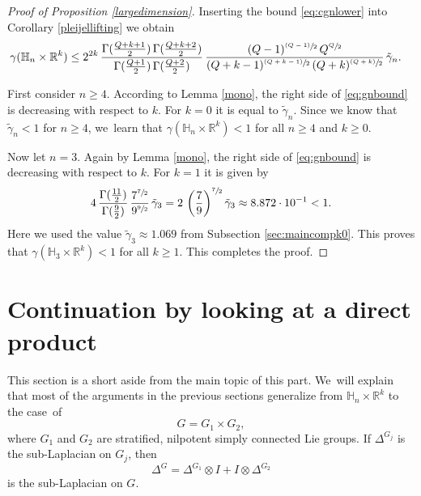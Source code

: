 \documentclass[11pt]{article}
\let\oldsfrac\sfrac
\renewcommand{\sfrac}[2]{{\oldsfrac{#1}{#2}}}
\newcommand{\psfrac}[2]{{\sfrac{(#1)}{#2}}}
\theoremstyle{definition}
\newcommand{\1}{\mathbbm{1}}
\newcommand{\R}{\mathbb{R}}
\numberwithin{equation}{section}
\begin{document}
\begin{proof}[Proof of Proposition \ref{largedimension}]
Inserting the bound \eqref{eq:cgnlower} into Corollary \ref{pleijellifting} we obtain
\begin{align}\label{eq:gnbound}
\gamma(\mathbb H_n\times\R^k) & \leq
2^{2k} \,\frac{\Gamma(\frac{Q+k+1}2)\,\Gamma(\frac{Q+k+2}2)}{\Gamma(\frac{Q+1}2)\,\Gamma(\frac {Q+2}2)} \,\frac{(Q-1)^{\psfrac{Q-1}2} \,Q^{\sfrac Q2}}{(Q+k-1)^{\psfrac{Q+k-1}2} \,(Q+k)^\psfrac{Q+k}2} \,\tilde\gamma_n.
\end{align}

First consider $n\geq 4$. According to Lemma \ref{mono}, the right side of \eqref{eq:gnbound} is decreasing with respect to $k$. For $k=0$ it is equal to $\tilde\gamma_n$. Since we know that $\tilde\gamma_n<1$ for $n\geq 4$, we~learn that $\gamma(\mathbb H_n\times\R^k)<1$ for all $n\geq 4$ and $k\geq 0$.

Now let $n= 3$. Again by Lemma \ref{mono}, the right side of \eqref{eq:gnbound} is decreasing with respect to $k$. For $k=1$ it is given by
\[
4 \,\frac{\Gamma(\frac{11}2)}{\Gamma(\frac{9}2)} \,\frac{7^{\sfrac{7}2}}{9^{\sfrac{9}2}} \,\tilde\gamma_3 = 2 \,\left(\frac 79\right)^{\sfrac{7}2} \tilde\gamma_3
\approx 8.872 \cdot 10^{-1} <1.
\]
Here we used the value $\tilde\gamma_3 \approx 1.069$ from Subsection \ref{sec:maincompk0}. This proves that $\gamma(\mathbb H_3\times\R^k)<1$ for all $k\geq 1$. This completes the proof.
\end{proof}

\section{Continuation by looking at a direct product}\label{s10}
This section is a short aside from the main topic of this part. We~will explain that most of the arguments in the previous sections generalize from $\mathbb H_n\times\R^k$ to the case~of
\[
G = G_1 \times G_2,
\]
where $G_1$ and $G_2$ are stratified, nilpotent simply connected Lie groups. If $\Delta^{G_j}$ is the sub-Laplacian on $G_j$, then
\[
\Delta^G = \Delta^{G_1} \otimes I + I\otimes \Delta^{G_2}
\]
is the sub-Laplacian on $G$.
\end{document}
